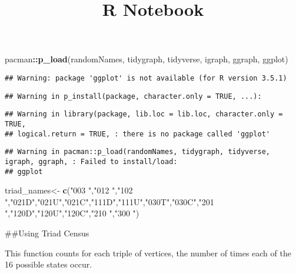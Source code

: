 \documentclass[]{article}
\title{R Notebook}
\author{}
\date{}
\newenvironment{Shaded}{\begin{snugshade}}{\end{snugshade}}
\newcommand{\KeywordTok}[1]{\textcolor[rgb]{0.13,0.29,0.53}{\textbf{#1}}}
\newcommand{\NormalTok}[1]{#1}
\newcommand{\OperatorTok}[1]{\textcolor[rgb]{0.81,0.36,0.00}{\textbf{#1}}}
\newcommand{\StringTok}[1]{\textcolor[rgb]{0.31,0.60,0.02}{#1}}
\begin{document}
\maketitle

\begin{Shaded}
\begin{Highlighting}[]
\NormalTok{pacman}\OperatorTok{::}\KeywordTok{p_load}\NormalTok{(randomNames, tidygraph, tidyverse, igraph, ggraph, ggplot)}
\end{Highlighting}
\end{Shaded}

\begin{verbatim}
## Warning: package 'ggplot' is not available (for R version 3.5.1)
\end{verbatim}

\begin{verbatim}
## Warning in p_install(package, character.only = TRUE, ...):
\end{verbatim}

\begin{verbatim}
## Warning in library(package, lib.loc = lib.loc, character.only = TRUE,
## logical.return = TRUE, : there is no package called 'ggplot'
\end{verbatim}

\begin{verbatim}
## Warning in pacman::p_load(randomNames, tidygraph, tidyverse, igraph, ggraph, : Failed to install/load:
## ggplot
\end{verbatim}

\begin{Shaded}
\begin{Highlighting}[]
\NormalTok{triad_names<-}\StringTok{ }\KeywordTok{c}\NormalTok{(}\StringTok{"003 "}\NormalTok{,}\StringTok{"012 "}\NormalTok{,}\StringTok{"102 "}\NormalTok{,}\StringTok{"021D"}\NormalTok{,}\StringTok{"021U"}\NormalTok{,}\StringTok{"021C"}\NormalTok{,}\StringTok{"111D"}\NormalTok{,}\StringTok{"111U"}\NormalTok{,}\StringTok{"030T"}\NormalTok{,}\StringTok{"030C"}\NormalTok{,}\StringTok{"201 "}\NormalTok{,}\StringTok{"120D"}\NormalTok{,}\StringTok{"120U"}\NormalTok{,}\StringTok{"120C"}\NormalTok{,}\StringTok{"210 "}\NormalTok{,}\StringTok{"300 "}\NormalTok{)}
\end{Highlighting}
\end{Shaded}

\#\#Using Triad Census

This function counts for each triple of vertices, the number of times
each of the 16 possible states occur.
\end{document}
